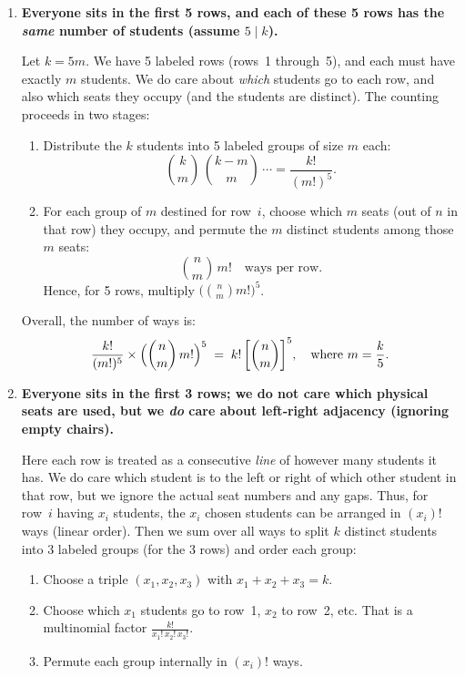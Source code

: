 \documentclass[docmute]{article}
\begin{document}
\begin{enumerate}
  \item[\textbf{(g)}]
    \textbf{Everyone sits in the first 5 rows, and each of these 5 rows has the \emph{same} number of students (assume $5\mid k$).}

    Let \(k=5m\).  We have 5 labeled rows (rows~1 through~5), and each must have exactly \(m\) students.  We do care about \emph{which} students go to each row, and also which seats they occupy (and the students are distinct).  The counting proceeds in two stages:

    \begin{enumerate}
      \item Distribute the $k$ students into 5 labeled groups of size $m$ each:
        \[
          \binom{k}{m}\,\binom{k-m}{m}\,\cdots = \frac{k!}{(m!)^5}.
        \]
      \item For each group of $m$ destined for row~$i$, choose which $m$ seats (out of $n$ in that row) they occupy, and permute the $m$ distinct students among those $m$ seats:
        \[
          \binom{n}{m}\,m! \quad\text{ways per row}.
        \]
      Hence, for 5 rows, multiply $\bigl(\binom{n}{m} m!\bigr)^5$.

    \end{enumerate}

    Overall, the number of ways is:
    \[
      \frac{k!}{(m!)^5} \times \Bigl(\binom{n}{m}\,m!\Bigr)^5
      \;=\;
      k!\,\biggl[\binom{n}{m}\biggr]^5,
      \quad\text{where }m=\frac{k}{5}.
    \]

  \item[\textbf{(h)}]
    \textbf{Everyone sits in the first 3 rows; we do not care which physical seats are used, but we \emph{do} care about left‐right adjacency (ignoring empty chairs).}

    Here each row is treated as a consecutive \emph{line} of however many students it has.  We do care which student is to the left or right of which other student in that row, but we ignore the actual seat numbers and any gaps.  Thus, for row~\(i\) having \(x_i\) students, the $x_i$ chosen students can be arranged in \((x_i)!\) ways (linear order).  Then we sum over all ways to split $k$ distinct students into 3 labeled groups (for the 3 rows) and order each group:

    \begin{enumerate}
      \item Choose a triple \((x_1,x_2,x_3)\) with $x_1+x_2+x_3 = k$.
      \item Choose which $x_1$ students go to row~1, $x_2$ to row~2, etc.  That is a multinomial factor $\frac{k!}{x_1!\,x_2!\,x_3!}$.
      \item Permute each group internally in $(x_i)!$ ways.


\end{enumerate}
\end{enumerate}
\end{document}
